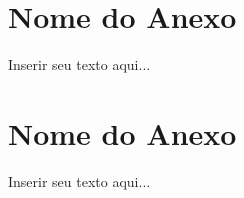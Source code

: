 %
%

\begin{anexosenv}
\partanexos

\chapter{Nome do Anexo}
\label{chap:anexox}

Inserir seu texto aqui...

\chapter{Nome do Anexo}
\label{chap:anexoy}

Inserir seu texto aqui...

\end{anexosenv}